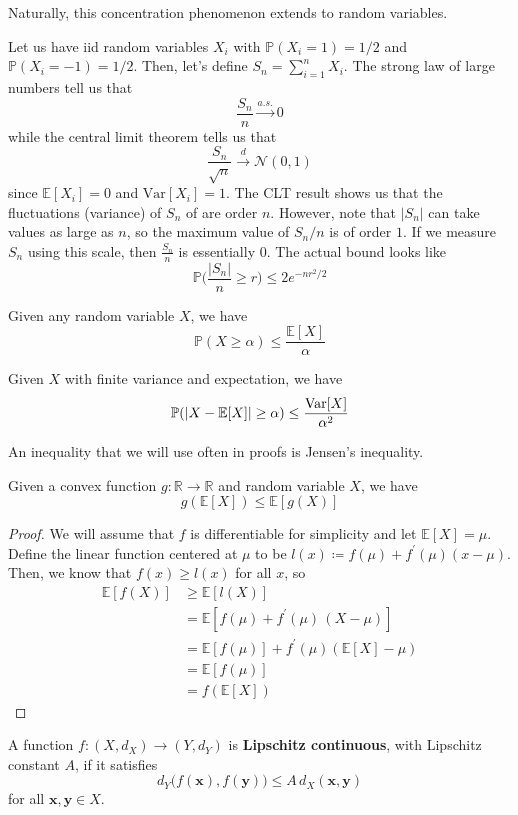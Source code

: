 Naturally, this concentration phenomenon extends to random variables. 

\begin{example}
Let us have iid random variables $X_i$ with $\mathbb{P}(X_i = 1) = 1/2$ and $\mathbb{P}(X_i = -1) = 1/2$. Then, let's define $S_n = \sum_{i=1}^n X_i$. The strong law of large numbers tell us that 
\[\frac{S_n}{n} \xrightarrow{a.s.} 0\]
while the central limit theorem tells us that 
\[\frac{S_n}{\sqrt{n}} \xrightarrow{d} \mathcal{N}(0, 1)\]
since $\mathbb{E}[X_i] = 0$ and $\mathrm{Var}[X_i] = 1$. The CLT result shows us that the fluctuations (variance) of $S_n$ of are order $n$. However, note that $|S_n|$ can take values as large as $n$, so the maximum value of $S_n / n$ is of order $1$. If we measure $S_n$ using this scale, then $\frac{S_n}{n}$ is essentially $0$. The actual bound looks like 
\[\mathbb{P} \bigg( \frac{|S_n|}{n} \geq r \bigg) \leq 2 e^{-n r^2 / 2}\]
\end{example}

\begin{lemma}
Given any random variable $X$, we have 
\[\mathbb{P}(X \geq \alpha) \leq \frac{\mathbb{E}[X]}{\alpha}\]
\end{lemma}

\begin{lemma}
Given $X$ with finite variance and expectation, we have 
\[\mathbb{P}(|X - \mathbb{E}[X]| \geq \alpha) \leq \frac{\Var[X]}{\alpha^2}\]
\end{lemma}

An inequality that we will use often in proofs is Jensen's inequality. 

\begin{lemma}
Given a convex function $g: \mathbb{R} \rightarrow \mathbb{R}$ and random variable $X$, we have 
\[g(\mathbb{E}[X]) \leq \mathbb{E}[g(X)]\]
\end{lemma}
\begin{proof}
We will assume that $f$ is differentiable for simplicity and let $\mathbb{E}[X] = \mu$. Define the linear function centered at $\mu$ to be $l(x) \coloneqq f(\mu) + f^\prime (\mu) (x - \mu)$. Then, we know that $f(x) \geq l(x)$ for all $x$, so 
\begin{align*}
    \mathbb{E}[f(X)] & \geq \mathbb{E}[ l(X)] \\ 
    & = \mathbb{E}[f(\mu) + f^\prime (\mu) \, (X - \mu)] \\
    & = \mathbb{E}[f(\mu)] + f^\prime (\mu) ( \mathbb{E}[X] - \mu) \\
    & = \mathbb{E}[f(\mu)] \\
    & = f(\mathbb{E}[X])
\end{align*}
\end{proof}

\begin{definition}
A function $f: (X, d_X) \longrightarrow (Y, d_Y)$ is \textbf{Lipschitz continuous}, with Lipschitz constant $A$, if it satisfies 
\[d_Y \big( f(\mathbf{x}), f(\mathbf{y})\big) \leq A \, d_X (\mathbf{x}, \mathbf{y})\]
for all $\mathbf{x}, \mathbf{y} \in X$. 
\end{definition}
